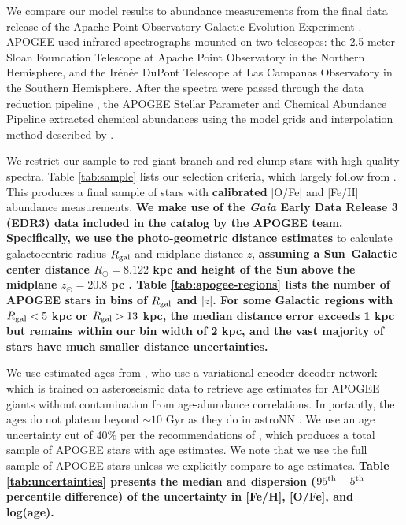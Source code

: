 \documentclass[twocolumn,twocolappendix,linenumbers]{aastex631}
\begin{document}
We compare our model results to abundance measurements from the final data release \citep[DR17;][]{Abdurro'uf2022-SDSSIV-DR17} of the Apache Point Observatory Galactic Evolution Experiment \citep[APOGEE;][]{Majewski2017-APOGEE}. APOGEE used infrared spectrographs \citep{Wilson2019-APOGEE-Spectrographs} mounted on two telescopes: the 2.5-meter Sloan Foundation Telescope \citep{Gunn2006-SloanTelescope} at Apache Point Observatory in the Northern Hemisphere, and the Ir{\'e}n{\'e}e DuPont Telescope \citep{BowenVaughan1973-DuPontTelescope} at Las Campanas Observatory in the Southern Hemisphere. After the spectra were passed through the data reduction pipeline \citep{Nidever2015-APOGEE-DataReduction}, the APOGEE Stellar Parameter and Chemical Abundance Pipeline \citep[ASPCAP;][]{Holtzmann2015-ASPCAP,GarciaPerez2016-ASPCAP} extracted chemical abundances using the model grids and interpolation method described by \citet{Jonsson2020-APOGEE-DR16}.

We restrict our sample to red giant branch and red clump stars with high-quality spectra. Table \ref{tab:sample} lists our selection criteria, which largely follow from \citet{Hayden2015-ChemicalCartography}. This produces a final sample of  stars with {\bf calibrated} [O/Fe] and [Fe/H] abundance measurements. {\bf We make use of the {\it Gaia} Early Data Release 3 (EDR3) data \citep{Gaia2016-Mission,Gaia2021-EDR3} included in the catalog by the APOGEE team. Specifically, we use the \citet{Bailer-Jones2021-GaiaDistances} photo-geometric distance estimates} to calculate galactocentric radius $R_{\rm gal}$ and midplane distance $z$, {\bf assuming a Sun--Galactic center distance $R_\odot=8.122$ kpc \citep{GRAVITY2018-GalactocentricDistance} and height of the Sun above the midplane $z_\odot=20.8$ pc \citep{BennetBovy2019-SunZHeight}. Table \ref{tab:apogee-regions} lists the number of APOGEE stars in bins of $R_{\rm gal}$ and $|z|$. For some Galactic regions with $R_{\rm gal}<5$ kpc or $R_{\rm gal}>13$ kpc, the median distance error exceeds 1 kpc but remains within our bin width of 2 kpc, and the vast majority of stars have much smaller distance uncertainties.}

We use estimated ages from \citet[][hereafter ]{Leung2023-Ages}, who use a variational encoder-decoder network which is trained on asteroseismic data to retrieve age estimates for APOGEE giants without contamination from age-abundance correlations. Importantly, the  ages do not plateau beyond $\sim10$ Gyr as they do in astroNN \citep{Mackereth2019-astroNN-Ages}. We use an age uncertainty cut of 40\% per the recommendations of , which produces a total sample of  APOGEE stars with age estimates. We note that we use the full sample of  APOGEE stars unless we explicitly compare to age estimates. {\bf Table \ref{tab:uncertainties} presents the median and dispersion ($95^{\rm th} - 5^{\rm th}$ percentile difference) of the uncertainty in [Fe/H], [O/Fe], and log(age).}
\end{document}
